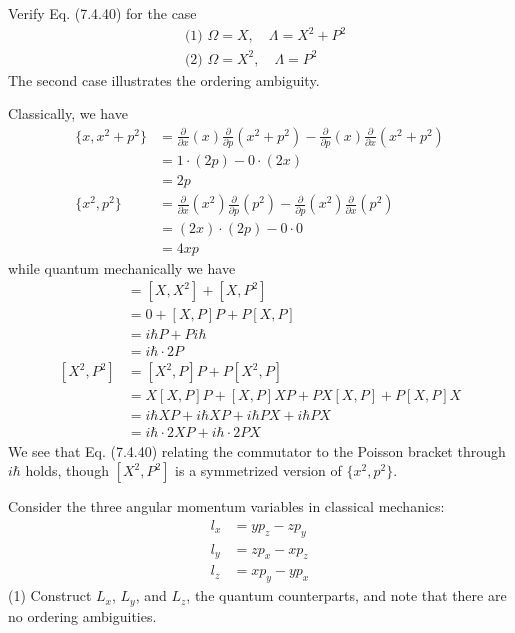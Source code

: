 \documentclass[../principles-of-quantum-mechanics.tex]{subfiles}
\begin{document}
\begin{questions}
		\question Verify Eq. (7.4.40) for the case
		\begin{align*}
			&\text{(1)}\,\,\Omega = X, \quad \Lambda = X^2 + P^2 \\
			&\text{(2)}\,\,\Omega = X^2, \quad \Lambda = P^2
		\end{align*}
		The second case illustrates the ordering ambiguity.
		\begin{solution}
			Classically, we have
			\begin{align*}
				\{x, x^2 + p^2\} &= \frac{\partial}{\partial x}(x)\frac{\partial}{\partial p}(x^2 + p^2) - \frac{\partial}{\partial p}(x)\frac{\partial}{\partial x}(x^2 + p^2) \\
				&= 1\cdot(2p) - 0\cdot(2x) \\
				&= 2p \\
				\{x^2, p^2\} &= \frac{\partial}{\partial x}(x^2)\frac{\partial}{\partial p}(p^2) - \frac{\partial}{\partial p}(x^2)\frac{\partial}{\partial x}(p^2) \\
				&= (2x)\cdot(2p) - 0\cdot0 \\
				&= 4xp
			\end{align*}
			while quantum mechanically we have
			\begin{align*}
				[X, X^2 + P^2] &= [X, X^2] + [X, P^2] \\
				&= 0 + [X, P]P + P[X, P] \\
				&= i\hbar P + Pi\hbar \\
				&= i\hbar\cdot 2P \\
				[X^2, P^2] &= [X^2, P]P + P[X^2, P] \\
				&= X[X, P]P + [X, P]XP + PX[X, P] + P[X, P]X \\
				&= i\hbar XP + i\hbar XP + i\hbar PX + i\hbar PX \\
				&= i\hbar\cdot 2XP + i\hbar \cdot 2PX
			\end{align*}
			We see that Eq. (7.4.40) relating the commutator to the Poisson bracket through $i\hbar$ holds, though $[X^2, P^2]$ is a symmetrized version of $\{x^2, p^2\}$.
		\end{solution}
		
		\question Consider the three angular momentum variables in classical mechanics:
		\begin{align*}
			l_x &= yp_z - zp_y \\
			l_y &= zp_x - xp_z \\
			l_z &= xp_y - yp_x
		\end{align*}
		(1) Construct $L_x$, $L_y$, and $L_z$, the quantum counterparts, and note that there are no ordering ambiguities.
		

\end{questions}
\end{document}
